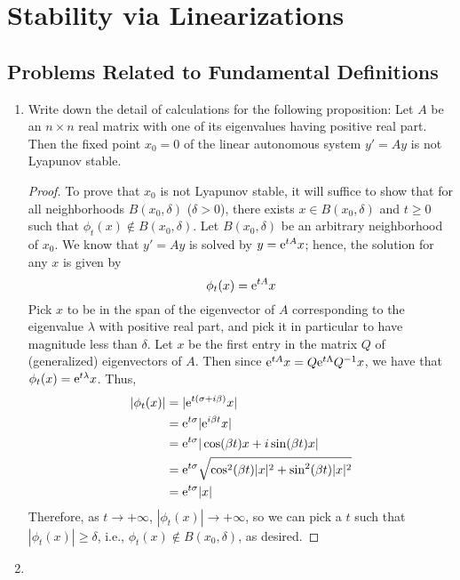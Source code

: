 \documentclass[../psets.tex]{subfiles}
\begin{document}
\section{Stability via Linearizations}
\subsection*{Problems Related to Fundamental Definitions}
\begin{enumerate}
    \item {}Write down the detail of calculations for the following proposition: Let $A$ be an $n\times n$ real matrix with one of its eigenvalues having positive real part. Then the fixed point $x_0=0$ of the linear autonomous system $y'=Ay$ is not Lyapunov stable.
    \begin{proof}
        To prove that $x_0$ is not Lyapunov stable, it will suffice to show that for all neighborhoods $B(x_0,\delta)$ ($\delta>0$), there exists $x\in B(x_0,\delta)$ and $t\geq 0$ such that $\phi_t(x)\notin B(x_0,\delta)$. Let $B(x_0,\delta)$ be an arbitrary neighborhood of $x_0$. We know that $y'=Ay$ is solved by $y=\e[tA]x$; hence, the solution for any $x$ is given by
        \begin{equation*}
            \phi_t(x) = \e[tA]x
        \end{equation*}
        Pick $x$ to be in the span of the eigenvector of $A$ corresponding to the eigenvalue $\lambda$ with positive real part, and pick it in particular to have magnitude less than $\delta$. Let $x$ be the first entry in the matrix $Q$ of (generalized) eigenvectors of $A$. Then since $\e[tA]x=Q\e[t\Lambda]Q^{-1}x$, we have that $\phi_t(x)=\e[t\lambda]x$. Thus,
        \begin{align*}
            |\phi_t(x)| &= |\e[t(\sigma+i\beta)]x|\\
            &= \e[t\sigma]|\e[i\beta t]x|\\
            &= \e[t\sigma]|\cos(\beta t)x+i\sin(\beta t)x|\\
            &= \e[t\sigma]\sqrt{\cos^2(\beta t)|x|^2+\sin^2(\beta t)|x|^2}\\
            &= \e[t\sigma]|x|
        \end{align*}
        Therefore, as $t\to+\infty$, $|\phi_t(x)|\to +\infty$, so we can pick a $t$ such that $|\phi_t(x)|\geq\delta$, i.e., $\phi_t(x)\notin B(x_0,\delta)$, as desired.
    \end{proof}
    \item 
    \begin{enumerate}

\end{enumerate}
\end{enumerate}
\end{document}
